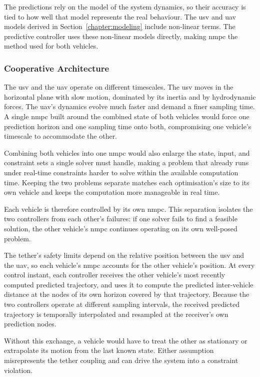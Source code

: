 The predictions rely on the model of the system dynamics, so their accuracy is tied to how well that model represents the real behaviour. The \gls{usv} and \gls{uav} models derived in Section~\ref{chapter:modeling} include non-linear terms. The predictive controller uses these non-linear models directly, making \gls{nmpc} the method used for both vehicles.


\subsubsection{Cooperative Architecture}
\label{sec:ctrl_coop_architecture}

The \gls{usv} and the \gls{uav} operate on different timescales. The \gls{usv} moves in the horizontal plane with slow motion, dominated by its inertia and by hydrodynamic forces. The \gls{uav}'s dynamics evolve much faster and demand a finer sampling time. A single \gls{nmpc} built around the combined state of both vehicles would force one prediction horizon and one sampling time onto both, compromising one vehicle's timescale to accommodate the other.

Combining both vehicles into one \gls{nmpc} would also enlarge the state, input, and constraint sets a single solver must handle, making a problem that already runs under real-time constraints harder to solve within the available computation time. Keeping the two problems separate matches each optimisation's size to its own vehicle and keeps the computation more manageable in real time.

Each vehicle is therefore controlled by its own \gls{nmpc}. This separation isolates the two controllers from each other's failures: if one solver fails to find a feasible solution, the other vehicle's \gls{nmpc} continues operating on its own well-posed problem.

The tether's safety limits depend on the relative position between the \gls{usv} and the \gls{uav}, so each vehicle's \gls{nmpc} accounts for the other vehicle's position. At every control instant, each controller receives the other vehicle's most recently computed predicted trajectory, and uses it to compute the predicted inter-vehicle distance at the nodes of its own horizon covered by that trajectory. Because the two controllers operate at different sampling intervals, the received predicted trajectory is temporally interpolated and resampled at the receiver's own prediction nodes.

Without this exchange, a vehicle would have to treat the other as stationary or extrapolate its motion from the last known state. Either assumption misrepresents the tether coupling and can drive the system into a constraint violation.

